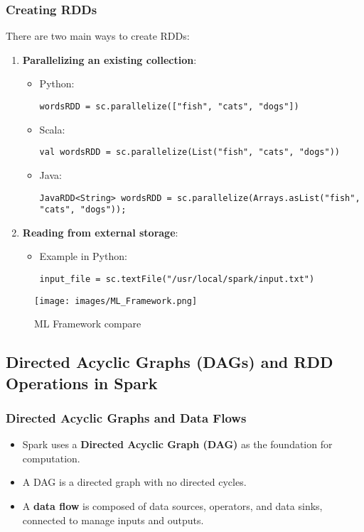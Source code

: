 \documentclass[12pt]{article}
\begin{document}
\subsubsection*{Creating RDDs}
There are two main ways to create RDDs:
\begin{enumerate}
    \item \textbf{Parallelizing an existing collection}:
    \begin{itemize}
        \item Python:
        \begin{verbatim}
wordsRDD = sc.parallelize(["fish", "cats", "dogs"])
        \end{verbatim}
        \item Scala:
        \begin{verbatim}
val wordsRDD = sc.parallelize(List("fish", "cats", "dogs"))
        \end{verbatim}
        \item Java:
        \begin{verbatim}
JavaRDD<String> wordsRDD = sc.parallelize(Arrays.asList("fish", "cats", "dogs"));
        \end{verbatim}
    \end{itemize}
    \item \textbf{Reading from external storage}:
    \begin{itemize}
        \item Example in Python:
        \begin{verbatim}
input_file = sc.textFile("/usr/local/spark/input.txt")
        \end{verbatim}
    \end{itemize}
\end{enumerate}

\begin{figure}[htbp]
    \centering
    \texttt{[image: images/ML\_Framework.png]}
    \caption{ML Framework compare}
    \label{fig:mapreduce}
\end{figure}

\subsection{Directed Acyclic Graphs (DAGs) and RDD Operations in Spark}

\subsubsection{Directed Acyclic Graphs and Data Flows}
\begin{itemize}
    \item Spark uses a \textbf{Directed Acyclic Graph (DAG)} as the foundation for computation.
    \item A DAG is a directed graph with no directed cycles.
    \item A \textbf{data flow} is composed of data sources, operators, and data sinks, connected to manage inputs and outputs.
\end{itemize}
\end{document}
